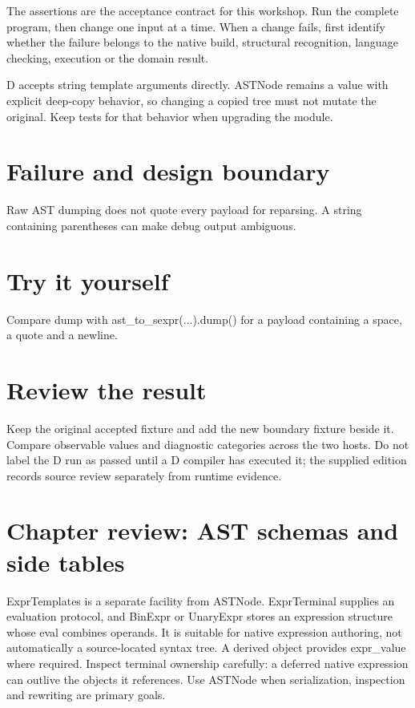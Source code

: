 The assertions are the acceptance contract for this workshop. Run the complete program, then change one input at a time. When a change fails, first identify whether the failure belongs to the native build, structural recognition, language checking, execution or the domain result.

\clearpage
{}
D accepts string template arguments directly. ASTNode remains a value with explicit deep-copy behavior, so changing a copied tree must not mutate the original. Keep tests for that behavior when upgrading the module.


\section*{Failure and design boundary}
Raw AST dumping does not quote every payload for reparsing. A string containing parentheses can make debug output ambiguous.

\section*{Try it yourself}
Compare dump with ast\_to\_sexpr(...).dump() for a payload containing a space, a quote and a newline.

\section*{Review the result}
Keep the original accepted fixture and add the new boundary fixture beside it. Compare observable values and diagnostic categories across the two hosts. Do not label the D run as passed until a D compiler has executed it; the supplied edition records source review separately from runtime evidence.

\clearpage
\section*{Chapter review: AST schemas and side tables}
ExprTemplates is a separate facility from ASTNode. ExprTerminal supplies an evaluation protocol, and BinExpr or UnaryExpr stores an expression structure whose eval combines operands. It is suitable for native expression authoring, not automatically a source-located syntax tree. A derived object provides expr\_value where required. Inspect terminal ownership carefully: a deferred native expression can outlive the objects it references. Use ASTNode when serialization, inspection and rewriting are primary goals.

